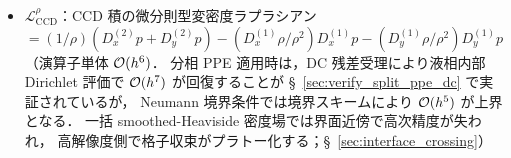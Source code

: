 \begin{itemize}[noitemsep]
          圧力ジャンプ使用時は同じ面・切断面位置で
          $\mathcal{G}^{\text{adj}}_\Gamma=\mathcal{G}^{\text{adj}}-B^{\text{adj}}$ とし，
          $B^{\text{adj}}$ は式~\eqref{eq:cut_face_young_laplace_jump} の
          切断面 Young--Laplace ジャンプと局所物理面距離 $H_f$ で構成する．
  \item $\mathcal{L}_{\mathrm{CCD}}^{\rho}$：CCD 積の微分則型変密度ラプラシアン
          $= (1/\rho)(D_x^{(2)}p + D_y^{(2)}p)
            - (D_x^{(1)}\rho/\rho^2)D_x^{(1)}p
            - (D_y^{(1)}\rho/\rho^2)D_y^{(1)}p$
          （演算子単体 $\mathcal{O}(h^6)$．
          分相 PPE 適用時は，DC 残差受理により液相内部 Dirichlet 評価で
          $\mathcal{O}(h^7)$ が回復することが §~\ref{sec:verify_split_ppe_dc} で実証されているが，
          Neumann 境界条件では境界スキームにより $\mathcal{O}(h^5)$ が上界となる．
          一括 smoothed-Heaviside 密度場では界面近傍で高次精度が失われ，
          高解像度側で格子収束がプラトー化する；§~\ref{sec:interface_crossing}）
\end{itemize}

